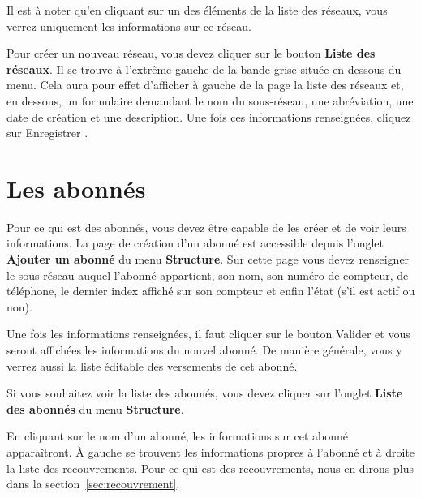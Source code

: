 Il est à noter qu'en cliquant sur un des éléments de la liste des réseaux, vous verrez uniquement les informations sur ce réseau.


Pour créer un nouveau réseau, vous devez cliquer sur le bouton \textbf{Liste des réseaux}. Il se trouve à l'extrême gauche de la bande grise située en dessous du menu. Cela aura pour effet d'afficher à gauche de la page la liste des réseaux et, en dessous, un formulaire demandant le nom du sous-réseau, une abréviation, une date de création et une description. Une fois ces informations renseignées, cliquez sur \og Enregistrer \fg{}.


\section{Les abonnés}

Pour ce qui est des abonnés, vous devez être capable de les créer et de voir leurs informations. La page de création d'un abonné est accessible depuis l'onglet \textbf{Ajouter un abonné} du menu \textbf{Structure}. Sur cette page vous devez renseigner le sous-réseau auquel l'abonné appartient, son nom, son numéro de compteur, de téléphone, le dernier index affiché sur son compteur et enfin l'état (s'il est actif ou non).


Une fois les informations renseignées, il faut cliquer sur le bouton \og Valider \fg{} et vous seront affichées les informations du nouvel abonné. De manière générale, vous y verrez aussi la liste éditable des versements de cet abonné.

Si vous souhaitez voir la liste des abonnés, vous devez cliquer sur l'onglet \textbf{Liste des abonnés} du menu \textbf{Structure}.


En cliquant sur le nom d'un abonné, les informations sur cet abonné apparaîtront. À gauche se trouvent les informations propres à l'abonné et à droite la liste des recouvrements. Pour ce qui est des recouvrements, nous en dirons plus dans la section~\ref{sec:recouvrement}.

